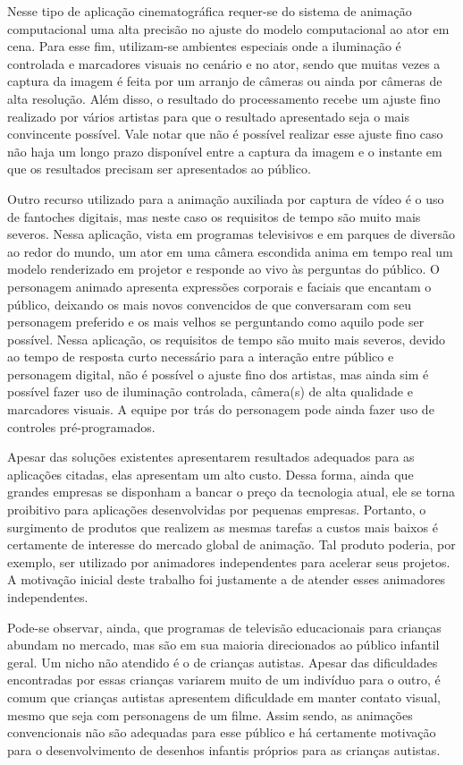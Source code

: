 Nesse tipo de aplicação cinematográfica requer-se do sistema de animação computacional uma alta precisão no
ajuste do modelo computacional ao ator em cena. Para esse fim, utilizam-se
ambientes especiais onde a iluminação é controlada e marcadores visuais no cenário e no ator, sendo que muitas vezes a captura da imagem é feita por
um arranjo de câmeras ou ainda por câmeras de alta resolução. Além disso, o resultado do processamento
recebe um ajuste fino realizado por vários artistas para que o resultado
apresentado seja o mais convincente possível. Vale notar que não é possível realizar esse ajuste fino caso não haja um longo prazo disponível entre a captura da imagem e o instante em que os resultados precisam ser apresentados ao público.

Outro recurso utilizado para a animação auxiliada por captura de vídeo é o uso de fantoches digitais, mas neste caso os
requisitos de tempo são muito mais severos. Nessa
aplicação, vista em programas televisivos e em parques de diversão ao redor do
mundo, um ator em uma câmera escondida anima em tempo real um modelo renderizado
em projetor e responde ao vivo às perguntas do público. O personagem animado
apresenta expressões corporais e faciais que encantam o público, deixando os
mais novos convencidos de que conversaram com seu personagem preferido e os mais
velhos se perguntando como aquilo pode ser possível. Nessa aplicação, os requisitos de tempo são muito mais severos, devido ao tempo de resposta
curto necessário para a interação entre público e personagem digital, não é
possível o ajuste fino dos artistas, mas ainda sim é possível fazer uso de
iluminação controlada, câmera(s) de alta qualidade e marcadores visuais. A
equipe por trás do personagem pode ainda fazer uso de controles pré-programados.

Apesar das soluções existentes apresentarem resultados adequados para as aplicações citadas, elas apresentam um alto custo. Dessa forma, ainda que grandes empresas se disponham a bancar o preço da tecnologia atual, ele se torna proibitivo para aplicações desenvolvidas por pequenas empresas. Portanto, o surgimento de produtos que realizem as mesmas
tarefas a custos mais baixos é certamente de interesse do mercado global de animação. Tal produto
poderia, por exemplo, ser utilizado por animadores independentes para acelerar seus projetos. A motivação inicial deste trabalho foi justamente a de atender esses animadores independentes.

Pode-se observar, ainda, que programas de televisão educacionais para crianças abundam no mercado, mas são em sua maioria
direcionados ao público infantil geral. Um nicho não atendido é o de
crianças autistas. Apesar das dificuldades encontradas por essas crianças
variarem muito de um indivíduo para o outro, é comum que crianças autistas
apresentem dificuldade em manter contato visual, mesmo que seja com personagens
de um filme. Assim sendo, as animações convencionais não são adequadas para esse público e há certamente motivação para o desenvolvimento de desenhos infantis próprios para as crianças autistas.


